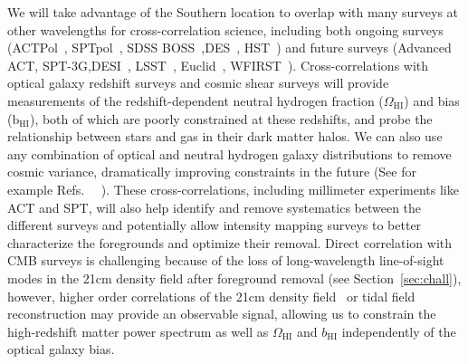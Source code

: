 \documentclass[]{spie}  %
\begin{document}
We will take advantage of the Southern location to overlap with many surveys at other wavelengths for cross-correlation science, including both ongoing surveys (ACTPol~\cite{2016arXiv160506569T}, SPTpol~\cite{2014SPIE.9153E..1PB}, SDSS BOSS~\cite{2013AJ....145...10D},DES~\cite{2016MNRAS.460.1270D}, HST~\cite{2014SPIE.9147E..5QW}) and future surveys (Advanced ACT\cite{2016JLTP..tmp..144H}, SPT-3G\cite{2014SPIE.9153E..1PB},DESI~\cite{2013arXiv1308.0847L}, LSST~\cite{2012arXiv1211.0310L}, Euclid~\cite{2012SPIE.8442E..0TL}, WFIRST~\cite{2013arXiv1305.5422S}). Cross-correlations with optical galaxy redshift surveys and cosmic shear surveys will provide measurements of the redshift-dependent neutral hydrogen fraction ($\Omega_{\mathrm{HI}}$) and bias ($\mathrm{b}_{\mathrm{HI}}$), both of which are poorly constrained at these redshifts, and probe the relationship between stars and gas in their dark matter halos. We can also use any combination of optical and neutral hydrogen galaxy distributions to remove cosmic variance, dramatically improving constraints in the future (See for example Refs. ~\cite{2009JCAP...10..007M}~\cite{2013MNRAS.432..318A}). These cross-correlations, including millimeter experiments like ACT and SPT, will also help identify and remove systematics between the different surveys and potentially allow intensity mapping surveys to better characterize the foregrounds and optimize their removal. Direct correlation with CMB surveys is challenging because of the loss of long-wavelength line-of-sight modes in the 21cm density field after foreground removal (see Section~\ref{sec:chall}), however, higher order correlations of the 21cm density field~\cite{moodley} or tidal field reconstruction\cite{2016PhRvD..93j3504Z} may provide an observable signal, allowing us to constrain the high-redshift matter power spectrum as well as $\Omega_{\mathrm{HI}}$ and $b_{\mathrm{HI}}$ independently of the optical galaxy bias.
\end{document}
